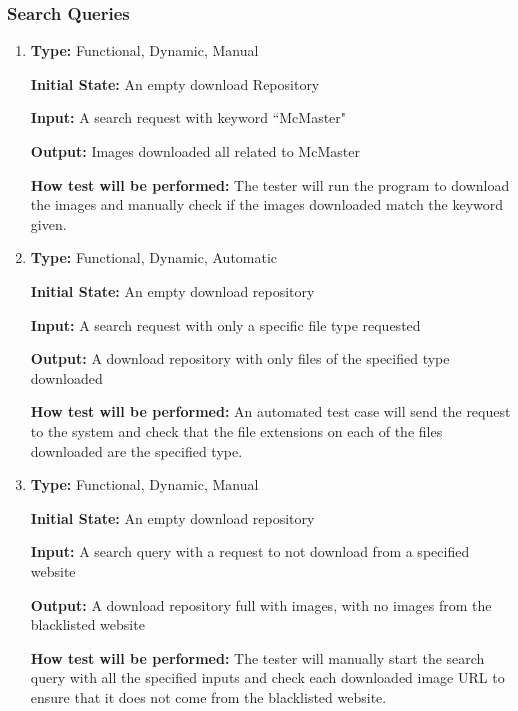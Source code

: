 \documentclass[12pt, titlepage]{article}
\begin{document}
\subsubsection{Search Queries}

\begin{enumerate}[label=FR-SQ\arabic*:, wide=0pt, leftmargin=*]

\item \phantom{empty}

\textbf{Type:} Functional, Dynamic, Manual

\textbf{Initial State:} An empty download Repository

\textbf{Input:} A search request with keyword ``McMaster"

\textbf{Output:} Images downloaded all related to McMaster

\textbf{How test will be performed:} The tester will run the program to download the images and manually check if the images downloaded match the keyword given.

\item \phantom{empty}

\textbf{Type:} Functional, Dynamic, Automatic
					
\textbf{Initial State:} An empty download repository
					
\textbf{Input:} A search request with only a specific file type requested
					
\textbf{Output:} A download repository with only files of the specified type downloaded
					
\textbf{How test will be performed:} An automated test case will send the request to the system and check that the file extensions on each of the files downloaded are the specified type.

\item \phantom{empty}

\textbf{Type:} Functional, Dynamic, Manual
					
\textbf{Initial State:} An empty download repository
					
\textbf{Input:} A search query with a request to not download from a specified website
					
\textbf{Output:} A download repository full with images, with no images from the blacklisted website
					
\textbf{How test will be performed:} The tester will manually start the search query with all the specified inputs and check each downloaded image URL to ensure that it does not come from the blacklisted website.


\end{enumerate}
\end{document}
